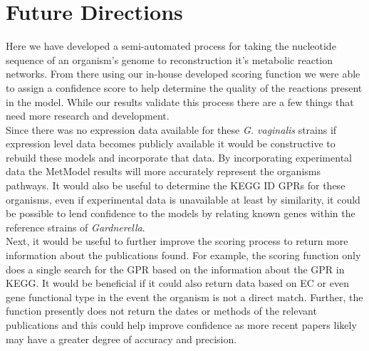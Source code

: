 
\chapter{Future Directions} %
 
\label{Chapter5} %


\indent\indent Here we have developed a semi-automated process for taking the nucleotide sequence of an organism's genome to reconstruction it's metabolic reaction networks.  From there using our in-house developed scoring function we were able to assign a confidence score to help determine the quality of the reactions present in the model.  While our results validate this process there are a few things that need more research and development.\\
\indent Since there was no expression data available for these \textit{G. vaginalis} strains if expression level data becomes publicly available it would be constructive to rebuild these models and incorporate that data. By incorporating experimental data the MetModel results will more accurately represent the organisms pathways. It would also be useful to determine the KEGG ID GPRs for these organisms, even if experimental data is unavailable at least by similarity, it could be possible to lend confidence to the models by relating known genes within the reference strains of {\it Gardnerella}.\\
%
%
%
%
%
%
%
%
\indent Next, it would be useful to further improve the scoring process to return more information about the publications found. For example, the scoring function only does a single search for the GPR based on the information about the GPR in KEGG.  It would be beneficial if it could also return data based on EC or even gene functional type in the event the organism is not a direct match.  Further, the function presently does not return the dates or methods of the relevant publications and this could help improve confidence as more recent papers likely may have a greater degree of accuracy and precision.\\
